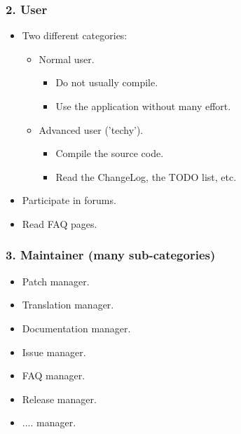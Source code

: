 \documentclass{beamer}
\begin{document}
\begin{frame}
 \frametitle{2. User}
 \begin{itemize}
  \item Two different categories:
  \begin{itemize}
   \item Normal user.
   \begin{itemize}
    \item Do not usually compile.
    \item Use the application without many effort.
   \end{itemize}

   \item Advanced user ('techy').
   \begin{itemize}
    \item Compile the source code.
    \item Read the ChangeLog, the TODO list, etc.
   \end{itemize}

  \end{itemize}
  \item Participate in forums.
  \item Read FAQ pages.
 \end{itemize}

\end{frame}


\begin{frame}
 \frametitle{3. Maintainer (many sub-categories)}
\begin{itemize}
  \item Patch manager.
  \item Translation manager.
  \item Documentation manager.
  \item Issue manager.
  \item FAQ manager.
  \item Release manager.
  \item .... manager.
\end{itemize}

\end{frame}

\end{document}
